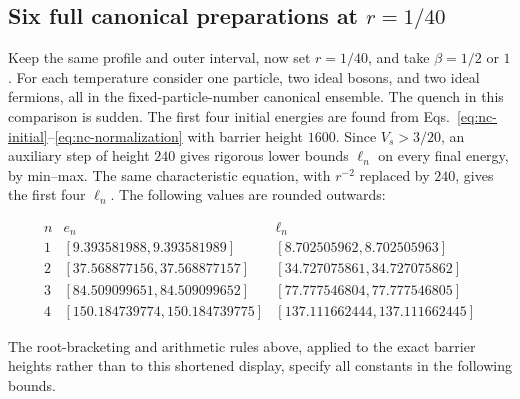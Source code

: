 \documentclass[aps,pra,reprint,superscriptaddress,longbibliography]{revtex4-2}
\begin{document}
\subsection{Six full canonical preparations at \texorpdfstring{$r=1/40$}{r=1/40}}

Keep the same profile and outer interval, now set $r=1/40$, and take
$\beta=1/2$ or $1$.  For each temperature consider one particle, two
ideal bosons, and two ideal fermions, all in the fixed-particle-number
canonical ensemble.  The quench in this comparison is sudden.
The first four initial energies are found from
Eqs.~\eqref{eq:nc-initial}--\eqref{eq:nc-normalization} with barrier
height $1600$.  Since $V_s>3/20$, an auxiliary step of height $240$
gives rigorous lower bounds $\ell_n$ on every final energy, by
min--max.  The same characteristic equation, with $r^{-2}$ replaced
by $240$, gives the first four $\ell_n$.  The following values
are rounded outwards:
\begin{widetext}
\begin{equation}
\begin{array}{c|cc}
n&e_n&\ell_n\\\hline
1&[9.393581988,9.393581989]&[8.702505962,8.702505963]\\
2&[37.568877156,37.568877157]&[34.727075861,34.727075862]\\
3&[84.509099651,84.509099652]&[77.777546804,77.777546805]\\
4&[150.184739774,150.184739775]&[137.111662444,137.111662445]
\end{array}
 \label{eq:nc-prep-initial}
\end{equation}
\end{widetext}
The root-bracketing and arithmetic rules above, applied to the exact
barrier heights rather than to this shortened display, specify all
constants in the following bounds.
\end{document}
